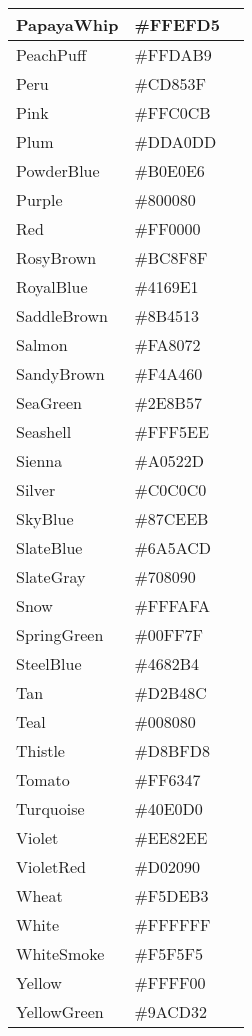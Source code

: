 \begin{longtable}{|p{100pt}|p{100pt}|p{100pt}|}
\hline
PapayaWhip		&\#FFEFD5	 &\cellcolor{PapayaWhip}\\
\hline
PeachPuff		&\#FFDAB9	 &\cellcolor{PeachPuff}\\
\hline
Peru				&\#CD853F	 &\cellcolor{Peru}\\
\hline
Pink				&\#FFC0CB	 &\cellcolor{Pink}\\
\hline
Plum			&\#DDA0DD&\cellcolor{Plum}	 \\
\hline
PowderBlue		&\#B0E0E6&\cellcolor{PowderBlue}	 \\
\hline
Purple			&\#800080	 &\cellcolor{Purple}\\
\hline
Red				&\#FF0000	 &\cellcolor{Red}\\
\hline
RosyBrown		&\#BC8F8F	 &\cellcolor{RosyBrown}\\
\hline
RoyalBlue		&\#4169E1	 &\cellcolor{RoyalBlue}\\
\hline
SaddleBrown		&\#8B4513&\cellcolor{SaddleBrown}	 \\
\hline
Salmon			&\#FA8072	 &\cellcolor{Salmon}\\
\hline
SandyBrown		&\#F4A460&\cellcolor{SandyBrown}	 \\
\hline
SeaGreen		&\#2E8B57	 &\cellcolor{SeaGreen}\\
\hline
Seashell			&\#FFF5EE	 &\cellcolor{Seashell}\\
\hline
Sienna			&\#A0522D&\cellcolor{Sienna}	 \\
\hline
Silver			&\#C0C0C0&\cellcolor{Silver}	 \\
\hline
SkyBlue			&\#87CEEB	 &\cellcolor{SkyBlue}\\
\hline
SlateBlue		&\#6A5ACD	&\cellcolor{SlateBlue} \\
\hline
SlateGray		&\#708090	 &\cellcolor{SlateGray}\\
\hline
Snow			&\#FFFAFA	 &\cellcolor{Snow}\\
\hline
SpringGreen		&\#00FF7F&\cellcolor{SpringGreen}	 \\
\hline
SteelBlue		&\#4682B4&\cellcolor{SteelBlue}	 \\
\hline
Tan				&\#D2B48C	 &\cellcolor{Tan}\\
\hline
Teal				&\#008080	 &\cellcolor{Teal}\\
\hline
Thistle			&\#D8BFD8&\cellcolor{Thistle}	 \\
\hline
Tomato			&\#FF6347	 &\cellcolor{Tomato}\\
\hline
Turquoise		&\#40E0D0&\cellcolor{Turquoise}	 \\
\hline
Violet			&\#EE82EE	 &\cellcolor{Violet}\\
\hline
VioletRed		&\#D02090&\cellcolor{VioletRed}	 \\
\hline
Wheat			&\#F5DEB3	 &\cellcolor{Wheat}\\
\hline
White			&\#FFFFFF	 &\cellcolor{White}\\
\hline
WhiteSmoke		&\#F5F5F5&\cellcolor{WhiteSmoke}	 \\
\hline
Yellow			&\#FFFF00	 &\cellcolor{Yellow}\\
\hline
YellowGreen		&\#9ACD32	&\cellcolor{YellowGreen}\\
\hline
\end{longtable}

